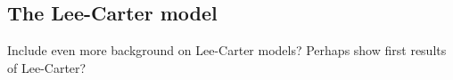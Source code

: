 \subsection{The Lee-Carter model}
\label{section:Lee-Carter}
\textcolor{myDarkGreen}{
Include even more background on Lee-Carter models? Perhaps show first results of Lee-Carter?
\newline \newline
}


